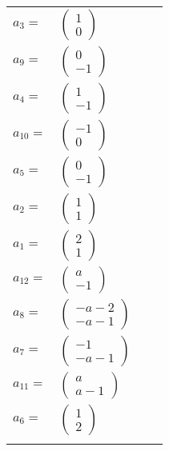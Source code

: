 \documentclass[1p]{elsarticle_modified}
\theoremstyle{definition}
\begin{document}
\begin{tabular}{m{7pt} m{180pt} m{7pt} m{180pt} }
\flushright $a_{3}=$&$\begin{pmatrix}1\\0\end{pmatrix}$ \\
\flushright $a_{9}=$&$\begin{pmatrix}0\\-1\end{pmatrix}$ \\
\flushright $a_{4}=$&$\begin{pmatrix}1\\-1\end{pmatrix}$ \\
\flushright $a_{10}=$&$\begin{pmatrix}-1\\0\end{pmatrix}$ \\
\flushright $a_{5}=$&$\begin{pmatrix}0\\-1\end{pmatrix}$ \\
\flushright $a_{2}=$&$\begin{pmatrix}1\\1\end{pmatrix}$ \\
\flushright $a_{1}=$&$\begin{pmatrix}2\\1\end{pmatrix}$ \\
\flushright $a_{12}=$&$\begin{pmatrix}a\\-1\end{pmatrix}$ \\
\flushright $a_{8}=$&$\begin{pmatrix}- a-2\\- a-1\end{pmatrix}$ \\
\flushright $a_{7}=$&$\begin{pmatrix}-1\\- a-1\end{pmatrix}$ \\
\flushright $a_{11}=$&$\begin{pmatrix}a\\a-1\end{pmatrix}$ \\
\flushright $a_{6}=$&$\begin{pmatrix}1\\2\end{pmatrix}$\\&\end{tabular}
\end{document}
